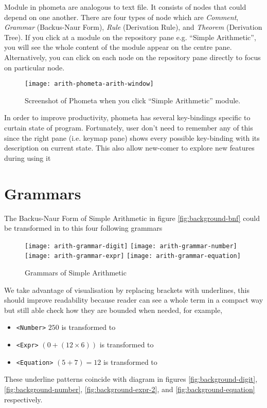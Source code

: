 \documentclass[master.tex]{subfiles}
\begin{document}
Module in phometa are analogous to text file. It consists of nodes that could
depend on one another. There are four types of node which are \emph{Comment},
\emph{Grammar} (Backus-Naur Form), \emph{Rule} (Derivation Rule), and
\emph{Theorem} (Derivation Tree). If you click at a module on the repository
pane e.g. ``Simple Arithmetic'', you will see the whole content of the module
appear on the centre pane. Alternatively, you can click on each node on the
repository pane directly to focus on particular node.

\begin{figure}[H]
    \centering
    \texttt{[image: arith-phometa-arith-window]}
    \caption{Screenshot of Phometa when you click ``Simple Arithmetic'' module.}
\label{fig:arith-phometa-arith-window}
\end{figure}

In order to improve productivity, phometa has several key-bindings specific to
curtain state of program. Fortunately, user don't need to remember any of this
since the right pane (i.e. keymap pane) shows every possible key-binding with
its description on current state. This also allow new-comer to explore new
features during using it

\section{Grammars}

The Backus-Naur Form of Simple Arithmetic in figure \ref{fig:background-bnf}
could be transformed in to this four following grammars
\begin{figure}[H]
    \centering
\begin{minipage}{0.7\textwidth}
    \texttt{[image: arith-grammar-digit]}
    \texttt{[image: arith-grammar-number]}
    \texttt{[image: arith-grammar-expr]}
    \texttt{[image: arith-grammar-equation]}
\end{minipage}

    \caption{Grammars of Simple Arithmetic}
\label{fig:arith-grammars}
\end{figure}

We take advantage of visualisation by replacing brackets with underlines, this
should improve readability because reader can see a whole term in a compact
way but still able check how they are bounded when needed, for example,
\begin{itemize}
\item \texttt{<Number>} $250$ is transformed to
   
\item \texttt{<Expr>} $(0 + (12 \times 6))$ is transformed to
   
\item \texttt{<Equation>} $(5 + 7) = 12$ is transformed to
   
\end{itemize}
These underline patterns coincide with diagram in figures \ref{fig:background-digit},
\ref{fig:background-number}, \ref{fig:background-expr-2}, and
\ref{fig:background-equation} respectively.
\end{document}
